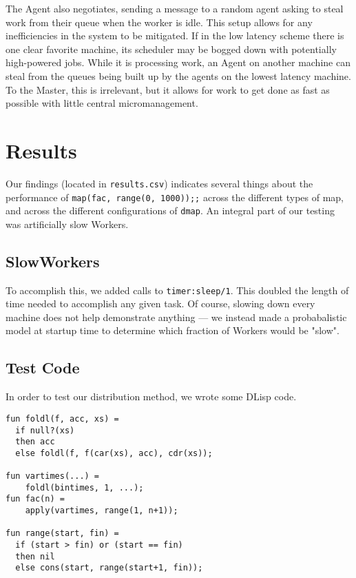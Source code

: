 \documentclass[letterpaper,twocolumn,10pt]{article}
\begin{document}
The Agent also negotiates, sending a message to a random agent asking to steal
work from their queue when the worker is idle. This setup allows for any
inefficiencies in the system to be mitigated. If in the low latency scheme
there is one clear favorite machine, its scheduler may be bogged down with
potentially high-powered jobs. While it is processing work, an Agent on another
machine can steal from the queues being built up by the agents on the lowest
latency machine. To the Master, this is irrelevant, but it allows for work to
get done as fast as possible with little central micromanagement.

\section{Results}

Our findings (located in \verb|results.csv|) indicates several things about the
performance of \verb|map(fac, range(0, 1000));;| across the different types of
map, and across the different configurations of \verb|dmap|. An integral part
of our testing was artificially slow Workers.

\subsection{SlowWorkers}

To accomplish this, we added calls to \verb|timer:sleep/1|. This doubled the
length of time needed to accomplish any given task. Of course, slowing down
every machine does not help demonstrate anything --- we instead made a
probabalistic model at startup time to determine which fraction of Workers
would be "slow".

\subsection{Test Code}

In order to test our distribution method, we wrote some DLisp code.

\begin{verbatim}
fun foldl(f, acc, xs) =
  if null?(xs)
  then acc
  else foldl(f, f(car(xs), acc), cdr(xs));

fun vartimes(...) =
    foldl(bintimes, 1, ...);
fun fac(n) =
    apply(vartimes, range(1, n+1));

fun range(start, fin) =
  if (start > fin) or (start == fin)
  then nil
  else cons(start, range(start+1, fin));
\end{verbatim}
\end{document}
